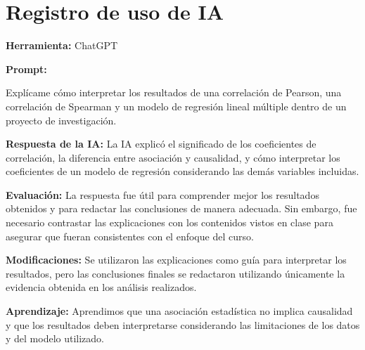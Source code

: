 \documentclass[12pt]{article}
\begin{document}
\section{Registro de uso de IA}

\begin{tcolorbox}[
colback=blue!5,
colframe=blue!75!white,
title=Interpretación de resultados estadísticos]
\textbf{Herramienta:} ChatGPT

\textbf{Prompt:}

Explícame cómo interpretar los resultados de una correlación de Pearson, una correlación de Spearman y un modelo de regresión lineal múltiple dentro de un proyecto de investigación.

\textbf{Respuesta de la IA:}
La IA explicó el significado de los coeficientes de correlación, la diferencia entre asociación y causalidad, y cómo interpretar los coeficientes de un modelo de regresión considerando las demás variables incluidas.

\textbf{Evaluación:}
La respuesta fue útil para comprender mejor los resultados obtenidos y para redactar las conclusiones de manera adecuada. Sin embargo, fue necesario contrastar las explicaciones con los contenidos vistos en clase para asegurar que fueran consistentes con el enfoque del curso.

\textbf{Modificaciones:}
Se utilizaron las explicaciones como guía para interpretar los resultados, pero las conclusiones finales se redactaron utilizando únicamente la evidencia obtenida en los análisis realizados.

\textbf{Aprendizaje:}
Aprendimos que una asociación estadística no implica causalidad y que los resultados deben interpretarse considerando las limitaciones de los datos y del modelo utilizado.

\end{tcolorbox}
\end{document}

